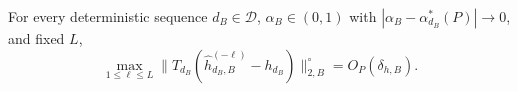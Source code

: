 For every deterministic sequence \(d_B\in\mathcal D\), \(\alpha_B\in(0,1)\) with \(|\alpha_B-\alpha_{d_B}^*(P)|\to0\), and fixed \(L\),
\[
\max_{1\le\ell\le L}\|T_{d_B}(\widehat h_{d_B,B}^{(-\ell)}-h_{d_B})\|_{2,B}^{\circ}=O_P(\delta_{h,B}).
\]